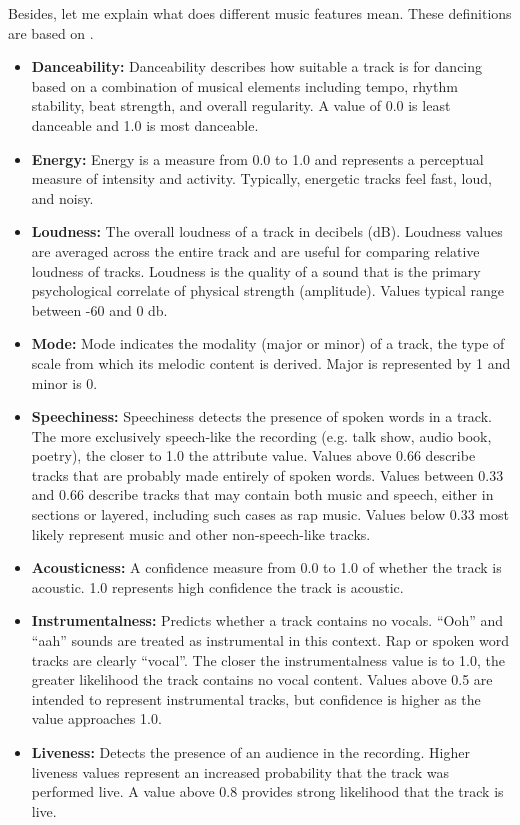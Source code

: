 \documentclass[12pt]{article}
\theoremstyle{plain}
\theoremstyle{definition}
\theoremstyle{remark}
\begin{document}
Besides, let me explain what does different music features mean. These definitions are based on \cite{2.3}.
\begin{itemize}
    \item \textbf{Danceability:} Danceability describes how suitable a track is for dancing based on a combination of musical elements including tempo, rhythm stability, beat strength, and overall regularity. A value of 0.0 is least danceable and 1.0 is most danceable.
    \item \textbf{Energy:} Energy is a measure from 0.0 to 1.0 and represents a perceptual measure of intensity and activity. Typically, energetic tracks feel fast, loud, and noisy. 
    \item \textbf{Loudness:} The overall loudness of a track in decibels (dB). Loudness values are averaged across the entire track and are useful for comparing relative loudness of tracks. Loudness is the quality of a sound that is the primary psychological correlate of physical strength (amplitude). Values typical range between -60 and 0 db.
    \item \textbf{Mode:} Mode indicates the modality (major or minor) of a track, the type of scale from which its melodic content is derived. Major is represented by 1 and minor is 0.
    \item \textbf{Speechiness:} Speechiness detects the presence of spoken words in a track. The more exclusively speech-like the recording (e.g. talk show, audio book, poetry), the closer to 1.0 the attribute value. Values above 0.66 describe tracks that are probably made entirely of spoken words. Values between 0.33 and 0.66 describe tracks that may contain both music and speech, either in sections or layered, including such cases as rap music. Values below 0.33 most likely represent music and other non-speech-like tracks.
    \item \textbf{Acousticness:} A confidence measure from 0.0 to 1.0 of whether the track is acoustic. 1.0 represents high confidence the track is acoustic.
    \item \textbf{Instrumentalness:} Predicts whether a track contains no vocals. “Ooh” and “aah” sounds are treated as instrumental in this context. Rap or spoken word tracks are clearly “vocal”. The closer the instrumentalness value is to 1.0, the greater likelihood the track contains no vocal content. Values above 0.5 are intended to represent instrumental tracks, but confidence is higher as the value approaches 1.0.
    \item \textbf{Liveness:} Detects the presence of an audience in the recording. Higher liveness values represent an increased probability that the track was performed live. A value above 0.8 provides strong likelihood that the track is live.

\end{itemize}
\end{document}
